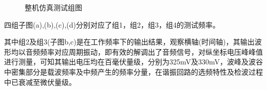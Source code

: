 \documentclass[a4paper,12pt,twoside]{article}
\begin{document}
\begin{figure}[H]
    \centering
     \hspace{0.01\linewidth}
    \caption{整机仿真测试组图}
  \label{整机测试结果}
\end{figure}

四组子图(a),(b),(c),(d)分别对应了组1，组2，组3，组4的测试频率。

其中组2及组3(子图b,c)是在工作频率下的输出结果，观察横轴(时间轴)，其输出波形均以音频频率对应周期振动，即有效的解调出了音频信号，对纵坐标电压峰峰值进行测量，可知其输出电压均在百毫伏量级，分别为325mV及330mV，波峰及波谷中密集部分是载波频率及中频产生的频率分量，在谐振回路的选频特性及检波过程中已衰减至微伏量级。
\end{document}
